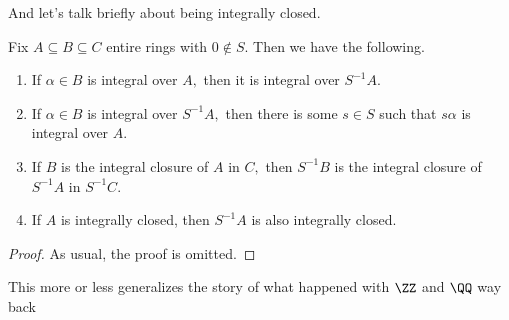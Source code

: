 And let's talk briefly about being integrally closed.
\begin{proposition}
    Fix $A\subseteq B\subseteq C$ entire rings with $0\notin S.$ Then we have the following.
    \begin{enumerate}
        \item If $\alpha\in B$ is integral over $A,$ then it is integral over $S^{-1}A.$
        \item If $\alpha\in B$ is integral over $S^{-1}A,$ then there is some $s\in S$ such that $s\alpha$ is integral over $A.$
        \item If $B$ is the integral closure of $A$ in $C,$ then $S^{-1}B$ is the integral closure of $S^{-1}A$ in $S^{-1}C.$
        \item If $A$ is integrally closed, then $S^{-1}A$ is also integrally closed.
    \end{enumerate}
\end{proposition}
\begin{proof}
    As usual, the proof is omitted.
\end{proof}
\begin{remark}
    This more or less generalizes the story of what happened with $\ZZ$ and $\QQ$ way back
\end{remark}

